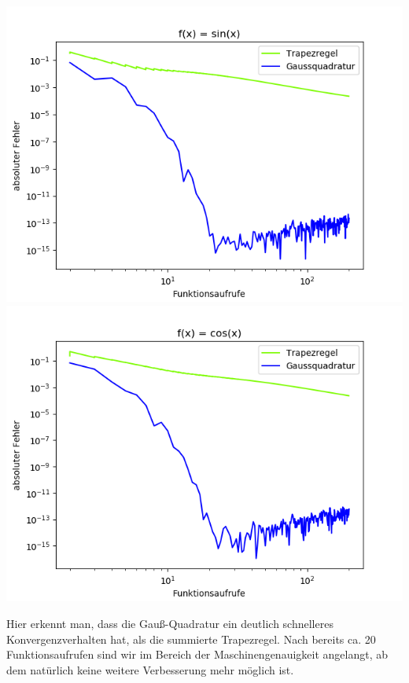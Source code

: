 \includegraphics[width=\linewidth]{Aufgabe_1/gauss-trapez.png}
\includegraphics[width=\linewidth]{Aufgabe_1/gauss-trapez,cos.png}

Hier erkennt man, dass die Gauß-Quadratur ein deutlich schnelleres Konvergenzverhalten hat, als die summierte Trapezregel. Nach bereits ca. 20 Funktionsaufrufen sind wir im Bereich der Maschinengenauigkeit angelangt, ab dem natürlich keine weitere Verbesserung mehr möglich ist.

